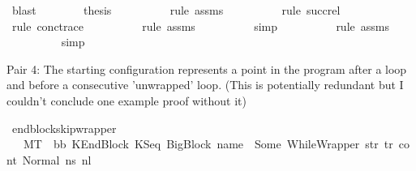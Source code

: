 \begin{isabellebody}
\ blast\isanewline
\ \ \ \ \ \ \isamarkupfalse%
\ {\isacharquery}{\kern0pt}thesis\isanewline
\ \ \ \ \ \ \ \ \isamarkupfalse%
\ {\isacharparenleft}{\kern0pt}rule\ assms{\isacharparenleft}{\kern0pt}{}{\isacharparenright}{\kern0pt}{\isacharparenright}{\kern0pt}\isanewline
\ \ \ \ \ \ \ \ \isamarkupfalse%
\ {\isacharparenleft}{\kern0pt}rule\ succ{\isacharunderscore}{\kern0pt}rel{\isacharparenright}{\kern0pt}\isanewline
\ \ \ \ \ \ \ \ \isamarkupfalse%
\ {\isacharparenleft}{\kern0pt}rule\ conc{\isacharunderscore}{\kern0pt}trace{\isacharparenright}{\kern0pt}\isanewline
\ \ \ \ \ \ \ \ \isamarkupfalse%
\ {\isacharparenleft}{\kern0pt}rule\ assms{\isacharparenleft}{\kern0pt}{}{\isacharparenright}{\kern0pt}{\isacharparenright}{\kern0pt}\isanewline
\ \ \ \ \ \ \ \ \isamarkupfalse%
\ {\isacharparenleft}{\kern0pt}simp{\isacharparenright}{\kern0pt}\isanewline
\ \ \ \ \ \ \ \ \isamarkupfalse%
\ {\isacharparenleft}{\kern0pt}rule\ assms{\isacharparenleft}{\kern0pt}{}{\isacharparenright}{\kern0pt}{\isacharparenright}{\kern0pt}\isanewline
\ \ \ \ \ \ \ \ \isamarkupfalse%
\ simp{\isacharplus}{\kern0pt}\isanewline
\ \ \ \ \ \ \ \ \isamarkupfalse%
\isanewline
\ \ \ \ \isamarkupfalse%
\isanewline
\ \ \isamarkupfalse%
\isanewline
{}\isamarkupfalse%
%
\endisatagproof
{\isafoldproof}%
%
\isadelimproof
%
\endisadelimproof
%
\begin{isamarkuptext}%
Pair 4: The starting configuration represents a point in the program after a loop and before a consecutive 'unwrapped' loop.
              (This is potentially redundant but I couldn't conclude one example proof without it)%
\end{isamarkuptext}\isamarkuptrue%
\isamarkupfalse%
\ endblock{\isacharunderscore}{\kern0pt}skip{\isacharunderscore}{\kern0pt}wrapper{\isacharcolon}{\kern0pt}\isanewline
\ \ \ {\isachardoublequoteopen}M{\isacharcomma}{\kern0pt}{\isasymLambda}{\isacharcomma}{\kern0pt}{\isasymGamma}{\isacharcomma}{\kern0pt}{\isasymOmega}{\isacharcomma}{\kern0pt}T\ {\isasymturnstile}\ {\isacharparenleft}{\kern0pt}bb{}{\isacharcomma}{\kern0pt}\ KEndBlock\ {\isacharparenleft}{\kern0pt}KSeq\ {\isacharparenleft}{\kern0pt}BigBlock\ name\ {\isacharbrackleft}{\kern0pt}{\isacharbrackright}{\kern0pt}\ {\isacharparenleft}{\kern0pt}Some\ {\isacharparenleft}{\kern0pt}WhileWrapper\ str{\isacharparenright}{\kern0pt}{\isacharparenright}{\kern0pt}\ tr{\isacharparenright}{\kern0pt}\ cont{}{\isacharparenright}{\kern0pt}{\isacharcomma}{\kern0pt}\ Normal\ ns{}{\isacharparenright}{\kern0pt}\ {\isacharminus}{\kern0pt}n{\isasymlongrightarrow}{\isacharcircum}{\kern0pt}l\ \isanewline

\end{isabellebody}
